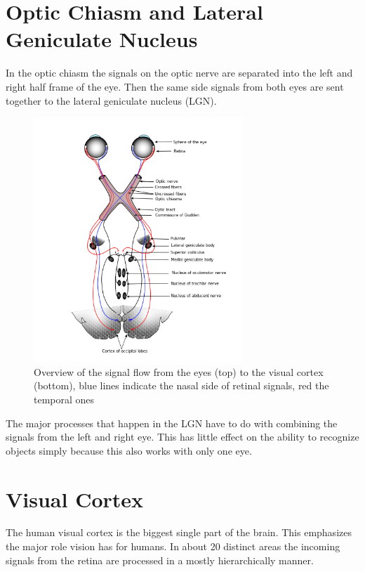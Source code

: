 	\section{Optic Chiasm and Lateral Geniculate Nucleus}
	
		In the optic chiasm the signals on the optic nerve are separated into the left and right half frame of the eye. Then the same side signals from both eyes are sent together to the lateral geniculate nucleus (LGN).

		\begin{figure}[H]
			\centering
			\captionsetup{justification=centering,margin=1cm}
			\includegraphics[width=0.7\textwidth]{images/optic-chiasm.png}
			\caption{Overview of the signal flow from the eyes (top) to the visual cortex (bottom), blue lines indicate the nasal side of retinal signals, red the temporal ones}
		\end{figure}

		The major processes that happen in the LGN have to do with combining the signals from the left and right eye. This has little effect on the ability to recognize objects simply because this also works with only one eye.
		
	
	\section{Visual Cortex}
	
		The human visual cortex is the biggest single part of the brain. This emphasizes the major role vision has for humans. In about 20 distinct areas the incoming signals from the retina are processed in a mostly hierarchically manner.
		
